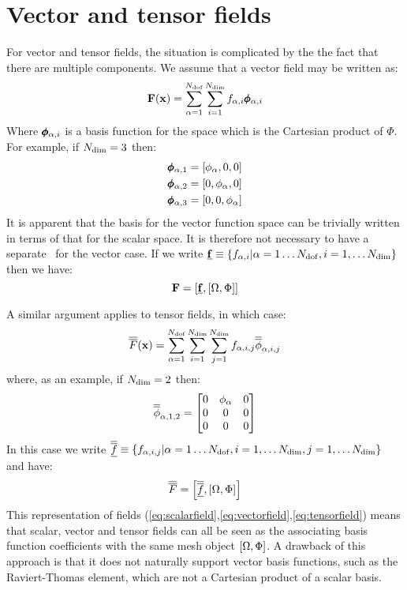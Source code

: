 \documentclass[a4paper, 11pt]{book}
\begin{document}
\section{Vector and tensor fields}\label{sec:vectorfields}

For vector and tensor fields, the situation is complicated by the the fact
that there are multiple components. We assume that a vector field may be
written as:
\begin{equation}
  \mathbf{F}(\mathbf{x})=\sum_{\alpha=1}^{N_\mathrm{dof}}\sum_{i=1}^{N_\mathrm{dim}} f_{\alpha,i}\pmb{\phi}_{\alpha,i}
\end{equation}
Where $\pmb{\phi}_{\alpha,i}$ is a basis function for
the space which is the Cartesian product of $\Phi$. For example, if
$N_\mathrm{dim}=3$ then:
\begin{gather}
  \pmb{\phi}_{\alpha,1}=[\phi_\alpha, 0, 0]\\
  \pmb{\phi}_{\alpha,2}=[0, \phi_\alpha, 0]\\
  \pmb{\phi}_{\alpha,3}=[0, 0, \phi_\alpha]
\end{gather}
It is apparent that the basis for the vector function space can be
trivially written in terms of that for the scalar space. It is therefore not
necessary to have a separate \meshtype\ for the vector case. If we write
$\underline{\mathbf{f}}\equiv\{f_{\alpha,i}|\alpha=1\ldots N_\mathrm{dof}, i=1,\ldots N_\mathrm{dim}\}$ then
we have:
\begin{equation}\label{eq:vectorfield}
  \mathbf{F}=\left[\underline{\mathbf{f}},[\Omega,\Phi]\right]
\end{equation}

A similar argument applies to tensor fields, in which case:
\begin{equation}
  \overline{\overline{F}}(\mathbf{x})=\sum_{\alpha=1}^{N_\mathrm{dof}} \sum_{i=1}^{N_\mathrm{dim}}\sum_{j=1}^{N_\mathrm{dim}}
  f_{\alpha,i,j}\overline{\overline{\phi}}_{\alpha,i,j}
\end{equation}
where, as an example, if $N_\mathrm{dim}=2$ then:
\begin{equation}
  \overline{\overline{\phi}}_{\alpha, 1, 2}=
  \begin{bmatrix}
    0 & \phi_\alpha & 0\\
    0 & 0 & 0\\
    0 & 0 & 0
  \end{bmatrix}
\end{equation}
In this case we write $\underline{\overline{\overline{f}}}\equiv\{f_{\alpha,i,j}|\alpha=1\ldots
N_\mathrm{dof}, i=1,\ldots N_\mathrm{dim}, j=1,\ldots N_\mathrm{dim}\}$ and have:
\begin{equation}\label{eq:tensorfield}
  \overline{\overline{F}}=\left[\underline{\overline{\overline{f}}},[\Omega,\Phi]\right]
\end{equation}
This representation of fields
(\ref{eq:scalarfield},\ref{eq:vectorfield},\ref{eq:tensorfield}) means that
scalar, vector and tensor fields can all be seen as the associating basis
function coefficients with the same mesh object $[\Omega,\Phi]$. A drawback
of this approach is that it does not naturally support vector basis
functions, such as the Raviert-Thomas element, which are not a Cartesian
product of a scalar basis.
\end{document}

